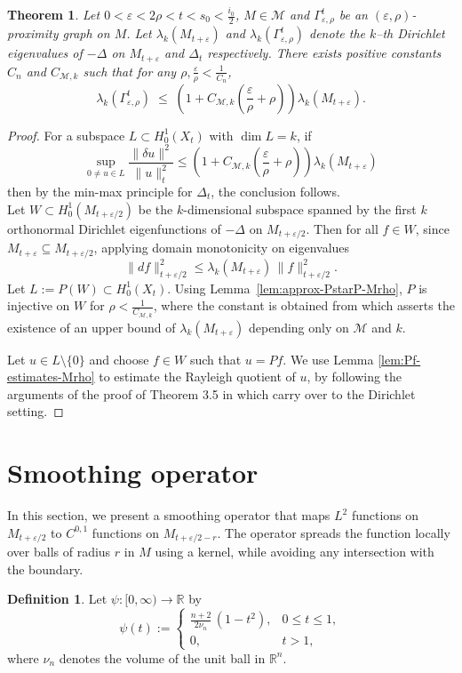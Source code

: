 \documentclass[10 pt, reqno]{amsart}
\newcommand{\M}{\mathcal{M}}
\newcommand{\lk}{\lambda_k}%
\newtheorem{theorem}{Theorem}[section]
\theoremstyle{definition}
\newtheorem{definition}{Definition}
\numberwithin{equation}{section}
\begin{document}
\begin{theorem}\label{prop:upper-bound-Mrho}
Let $0<\varepsilon<2\rho< t<s_0<\frac{i_0}{2}$, $M\in \M$ and $\Gamma^t_{\varepsilon,\rho}$ be an $(\varepsilon,\rho)$-proximity graph on $M$. 
Let $\lambda_k(M_{t+\varepsilon})$ and $\lk(\Gamma^t_{\varepsilon,\rho})$ denote the $k$--th Dirichlet eigenvalues of $-\Delta$ on $M_{t+\varepsilon}$ and $\Delta_t$ respectively.  There exists positive constants $C_n$ and $C_{\M,k}$ such that for any $\rho,\frac{\varepsilon}{\rho}<\frac{1}{C_n}$,
\[
\lambda_k(\Gamma^t_{\varepsilon,\rho})
\;\le\;
\left(1+C_{\M,k}\left(\frac{\varepsilon}{\rho}+\rho\right)\right)\lk(M_{t+\varepsilon}).
\]

\end{theorem}

\begin{proof}
For a subspace $L\subset H^1_0(X_{t})$ with $\dim L=k$, if
\[
\sup_{0\neq u\in L}
\frac{\|\delta u\|^2}{\|u\|_{t}^2}
\le
\left(1+C_{\M,k}\left(\frac{\varepsilon}{\rho}+\rho\right)\right)\lk(M_{t+\varepsilon})
\]
then by the min-max principle for $\Delta_t$, the conclusion follows.\\
Let $W\subset H_0^1(M_{t+\varepsilon/2})$ be the $k$-dimensional subspace spanned by the first $k$ orthonormal Dirichlet eigenfunctions of $-\Delta$ on $M_{t+\varepsilon/2}$.
Then for all $f\in W$, since $M_{t+\varepsilon}\subseteq M_{t+\varepsilon/2}$, applying domain monotonicity on eigenvalues
\[
\|d f\|_{t+\varepsilon/2}^2
\le
\lambda_k(M_{t+\varepsilon})\,\|f\|_{t+\varepsilon/2}^2.
\]
Let $L := P(W)\subset H^1_0(X_t).$   
Using Lemma~\ref{lem:approx-PstarP-Mrho},  $P$ is injective on $W$ for $\rho<\frac{1}{C_{\M,k}}$, where the constant is obtained from \cite{cheng} which asserts the existence of an upper bound of $\lk(M_{t+\varepsilon})$  depending only on $\M$ and $k$. 

Let $u\in L\setminus\{0\}$ and choose $f\in W$ such that $u=Pf$. 
We use Lemma \ref{lem:Pf-estimates-Mrho} to estimate the Rayleigh quotient of $u$, by following the arguments of the proof of Theorem 3.5 in \cite{MaityBhattacharya2026} which carry over to the Dirichlet setting.

\end{proof}

\section{Smoothing operator}


In this section, we present a smoothing operator that maps $L^2$ functions on $M_{t+\varepsilon/2}$ to $C^{0,1}$ functions on $M_{t+\varepsilon/2-r}$. The operator spreads the function locally over balls of radius $r$ in $M$ using a kernel, while avoiding any intersection with the boundary.
\begin{definition}
  Let  $\psi\colon [0,\infty)\to\mathbb{R}$ by
\[
\psi(t)
:=
\begin{cases}
\displaystyle
\frac{n+2}{2\nu_n}\,(1-t^2), & 0\le t\le 1,\\[0.3em]
0, & t>1,
\end{cases}
\]
where $\nu_n$ denotes the volume of the unit ball in $\mathbb{R}^n$.  
\end{definition}
\end{document}
